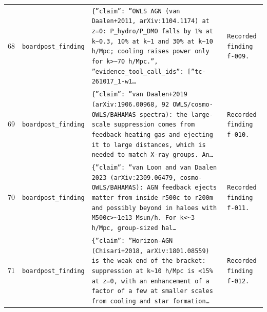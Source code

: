 \documentclass[11pt,a4paper]{article}
\begin{document}
\begin{longtable}{@{}p{}p{}p{}p{}@{}}
68 & \texttt{board}\newline\texttt{post\_\allowbreak{}finding} & \texttt{\{''claim'':\allowbreak{} ''OWLS AGN (van Daalen+2011,\allowbreak{} arXiv:\allowbreak{}1104.1174)\allowbreak{} at z=\allowbreak{}0:\allowbreak{} P\_\allowbreak{}hydro/\allowbreak{}P\_\allowbreak{}DMO falls by 1\% at k\textasciitilde{}\allowbreak{}0.3,\allowbreak{} 10\% at k\textasciitilde{}\allowbreak{}1 and 30\% at k\textasciitilde{}\allowbreak{}10 h/\allowbreak{}Mpc;\allowbreak{} cooling raises power only for k\textgreater{}\allowbreak{}\textasciitilde{}\allowbreak{}70 h/\allowbreak{}Mpc.'',\allowbreak{} ''evidence\_\allowbreak{}tool\_\allowbreak{}call\_\allowbreak{}ids'':\allowbreak{} [''tc-261017\_\allowbreak{}1-w1\ldots{}\allowbreak{}} & \texttt{Recorded finding f-009.} \\
69 & \texttt{board}\newline\texttt{post\_\allowbreak{}finding} & \texttt{\{''claim'':\allowbreak{} ''van Daalen+2019 (arXiv:\allowbreak{}1906.00968,\allowbreak{} 92 OWLS/\allowbreak{}cosmo-OWLS/\allowbreak{}BAHAMAS spectra)\allowbreak{}:\allowbreak{} the large-scale suppression comes from feedback heating gas and ejecting it to large distances,\allowbreak{} which is needed to match X-ray groups. An\ldots{}\allowbreak{}} & \texttt{Recorded finding f-010.} \\
70 & \texttt{board}\newline\texttt{post\_\allowbreak{}finding} & \texttt{\{''claim'':\allowbreak{} ''van Loon and van Daalen 2023 (arXiv:\allowbreak{}2309.06479,\allowbreak{} cosmo-OWLS/\allowbreak{}BAHAMAS)\allowbreak{}:\allowbreak{} AGN feedback ejects matter from inside r500c to r200m and possibly beyond in haloes with M500c\textgreater{}\allowbreak{}\textasciitilde{}\allowbreak{}1e13 Msun/\allowbreak{}h. For k\textless{}\allowbreak{}\textasciitilde{}\allowbreak{}3 h/\allowbreak{}Mpc,\allowbreak{} group-sized hal\ldots{}\allowbreak{}} & \texttt{Recorded finding f-011.} \\
71 & \texttt{board}\newline\texttt{post\_\allowbreak{}finding} & \texttt{\{''claim'':\allowbreak{} ''Horizon-AGN (Chisari+2018,\allowbreak{} arXiv:\allowbreak{}1801.08559)\allowbreak{} is the weak end of the bracket:\allowbreak{} suppression at k\textasciitilde{}\allowbreak{}10 h/\allowbreak{}Mpc is \textless{}\allowbreak{}15\% at z=\allowbreak{}0,\allowbreak{} with an enhancement of a factor of a few at smaller scales from cooling and star formation\ldots{}\allowbreak{}} & \texttt{Recorded finding f-012.} \\

\end{longtable}
\end{document}

